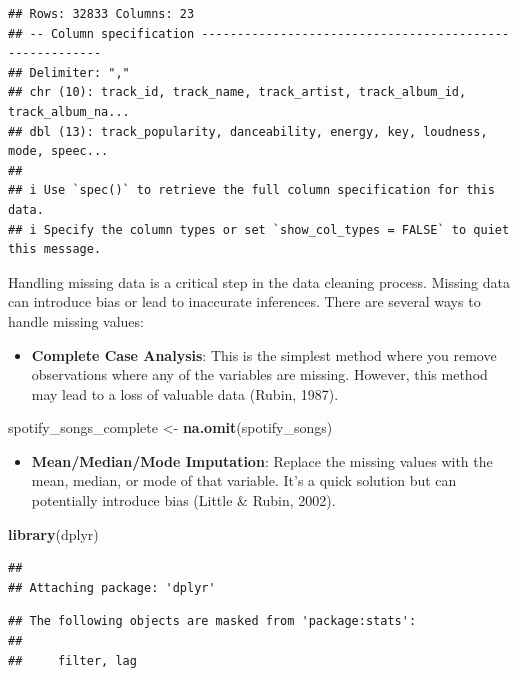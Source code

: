 \documentclass[
  b5paper]{book}
\newenvironment{Shaded}{\begin{snugshade}}{\end{snugshade}}
\newcommand{\FunctionTok}[1]{\textcolor[rgb]{0.13,0.29,0.53}{\textbf{#1}}}
\newcommand{\NormalTok}[1]{#1}
\newcommand{\OtherTok}[1]{\textcolor[rgb]{0.56,0.35,0.01}{#1}}
\providecommand{\tightlist}{%
  \setlength{\itemsep}{0pt}\setlength{\parskip}{0pt}}
\begin{document}
\begin{verbatim}
## Rows: 32833 Columns: 23
## -- Column specification --------------------------------------------------------
## Delimiter: ","
## chr (10): track_id, track_name, track_artist, track_album_id, track_album_na...
## dbl (13): track_popularity, danceability, energy, key, loudness, mode, speec...
## 
## i Use `spec()` to retrieve the full column specification for this data.
## i Specify the column types or set `show_col_types = FALSE` to quiet this message.
\end{verbatim}

Handling missing data is a critical step in the data cleaning process. Missing data can introduce bias or lead to inaccurate inferences. There are several ways to handle missing values:

\begin{itemize}
\tightlist
\item
  \textbf{Complete Case Analysis}: This is the simplest method where you remove observations where any of the variables are missing. However, this method may lead to a loss of valuable data (Rubin, 1987).
\end{itemize}

\begin{Shaded}
\begin{Highlighting}[]
\NormalTok{spotify\_songs\_complete }\OtherTok{\textless{}{-}} \FunctionTok{na.omit}\NormalTok{(spotify\_songs)}
\end{Highlighting}
\end{Shaded}

\begin{itemize}
\tightlist
\item
  \textbf{Mean/Median/Mode Imputation}: Replace the missing values with the mean, median, or mode of that variable. It's a quick solution but can potentially introduce bias (Little \& Rubin, 2002).
\end{itemize}

\begin{Shaded}
\begin{Highlighting}[]
\FunctionTok{library}\NormalTok{(dplyr)}
\end{Highlighting}
\end{Shaded}

\begin{verbatim}
## 
## Attaching package: 'dplyr'
\end{verbatim}

\begin{verbatim}
## The following objects are masked from 'package:stats':
## 
##     filter, lag
\end{verbatim}
\end{document}
